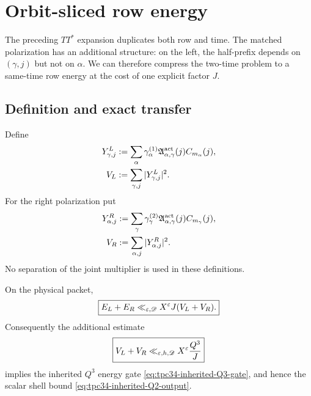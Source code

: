 \section{Orbit-sliced row energy}
\label{sec:tpc34-orbit-sliced}

The preceding \(TT^*\) expansion duplicates both row and time.  The
matched polarization has an additional structure: on the left, the
half-prefix depends on \((\gamma,j)\) but not on \(\alpha\).  We can
therefore compress the two-time problem to a same-time row energy at the
cost of one explicit factor \(J\).

\subsection{Definition and exact transfer}

Define
\begin{align}
 Y_{\gamma,j}^L
 &:=
 \sum_\alpha\gamma_\alpha^{(1)}
 \mathfrak A_{\alpha,\gamma}^{\rm act}(j)
 C_{m_\alpha}(j),
 \label{eq:tpc34-left-orbit-slice}\\
 V_L
 &:=
 \sum_{\gamma,j}|Y_{\gamma,j}^L|^2.
 \label{eq:tpc34-left-orbit-energy}
\end{align}
For the right polarization put
\begin{align}
 Y_{\alpha,j}^R
 &:=
 \sum_\gamma\gamma_\gamma^{(2)}
 \mathfrak A_{\alpha,\gamma}^{\rm act}(j)
 C_{m_\gamma}(j),
 \label{eq:tpc34-right-orbit-slice}\\
 V_R
 &:=
 \sum_{\alpha,j}|Y_{\alpha,j}^R|^2.
 \label{eq:tpc34-right-orbit-energy}
\end{align}
No separation of the joint multiplier is used in these definitions.

\begin{theorem}
\label{thm:tpc34-orbit-sliced-transfer}
On the physical packet,
\begin{equation}
 \boxed{
 E_L+E_R
 \ll_{\varepsilon,\mathscr D}X^\varepsilon J(V_L+V_R).}
 \label{eq:tpc34-orbit-sliced-transfer}
\end{equation}
Consequently the additional estimate
\begin{equation}
 \boxed{
 V_L+V_R\ll_{\varepsilon,h,\mathscr D}X^\varepsilon\frac{Q^3}{J}}
 \label{eq:tpc34-orbit-energy-gate}
\end{equation}
implies the inherited \(Q^3\) energy gate
\eqref{eq:tpc34-inherited-Q3-gate}, and hence the scalar shell bound
\eqref{eq:tpc34-inherited-Q2-output}.
\end{theorem}

